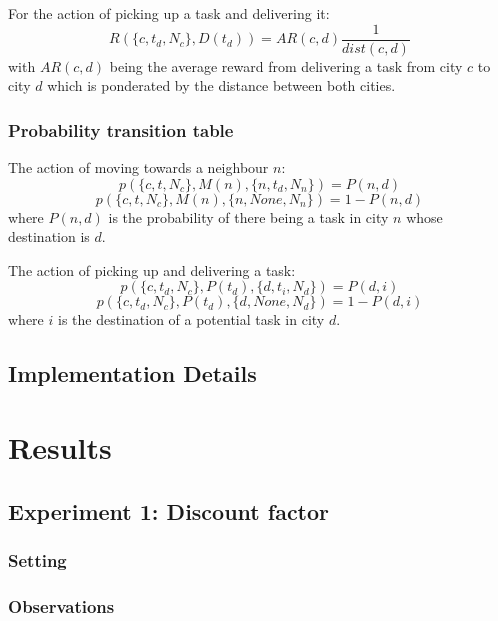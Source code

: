 \documentclass[11pt]{article}
\begin{document}
For the action of picking up a task and delivering it:
$$R(\{c, t_d, N_c\}, D(t_d)) = AR(c, d) \frac{1}{dist(c, d)}$$
with $AR(c, d)$ being the average reward from delivering a task from city
$c$ to city $d$ which is ponderated by the distance between both cities.

\subsubsection{Probability transition table}
The action of moving towards a neighbour $n$:
$$ p(\{c, t, N_c\}, M(n), \{n, t_d, N_n\}) = P(n,d)$$
$$ p(\{c, t, N_c\}, M(n), \{n, None, N_n\}) = 1 - P(n,d)$$
where $P(n,d)$ is the probability of there being a task in city $n$ whose
destination is $d$.

The action of picking up and delivering a task:
$$ p(\{c, t_d, N_c\}, P(t_d), \{d, t_i, N_d\}) = P(d, i) $$
$$ p(\{c, t_d, N_c\}, P(t_d), \{d, None, N_d\}) = 1 - P(d, i) $$
where $i$ is the destination of a potential task in city $d$.
\subsection{Implementation Details}

\section{Results}

\subsection{Experiment 1: Discount factor}

\subsubsection{Setting}

\subsubsection{Observations}
\end{document}
